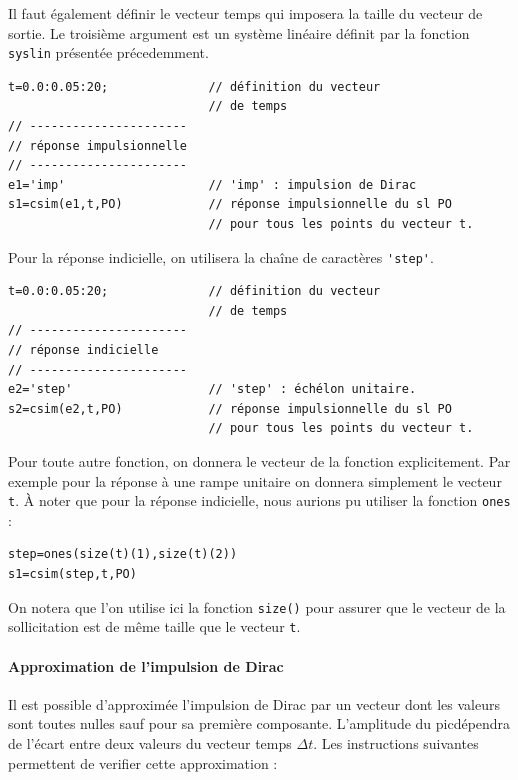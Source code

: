 Il faut également définir le vecteur temps qui imposera la 
taille du vecteur de sortie. Le troisième argument est un système linéaire
définit par la fonction \verb?syslin? présentée précedemment. 
\begin{code}
\begin{verbatim}
t=0.0:0.05:20;              // définition du vecteur 
                            // de temps
// ----------------------
// réponse impulsionnelle
// ----------------------
e1='imp'                    // 'imp' : impulsion de Dirac
s1=csim(e1,t,PO)            // réponse impulsionnelle du sl PO
                            // pour tous les points du vecteur t.

\end{verbatim}
\end{code}
Pour la réponse indicielle, on utilisera la chaîne de caractères \verb?'step'?.
\begin{code}
\begin{verbatim}
t=0.0:0.05:20;              // définition du vecteur 
                            // de temps
// ----------------------
// réponse indicielle 
// ----------------------
e2='step'                   // 'step' : échélon unitaire.
s2=csim(e2,t,PO)            // réponse impulsionnelle du sl PO
                            // pour tous les points du vecteur t.

\end{verbatim}
\end{code}
Pour toute autre fonction, on donnera le vecteur de la fonction explicitement. 
Par exemple pour la réponse à une rampe unitaire on donnera simplement 
le vecteur \verb?t?. \`A noter que pour la réponse indicielle, nous aurions pu utiliser
la fonction \verb?ones? :

\begin{code}
\begin{verbatim}
step=ones(size(t)(1),size(t)(2))
s1=csim(step,t,PO)
\end{verbatim}
\end{code}

On notera que l'on utilise ici la fonction \verb?size()? pour assurer que le vecteur 
de la sollicitation est de même taille que le vecteur \verb?t?. 

\paragraph{Approximation de l'impulsion de Dirac}

Il est possible d'approximée l'impulsion de Dirac par un vecteur dont
les valeurs sont toutes nulles sauf pour sa première composante. 
L'amplitude du \og pic\fg dépendra de l'écart entre deux valeurs du vecteur temps $\Delta t$. 
Les instructions suivantes permettent de verifier cette approximation :

